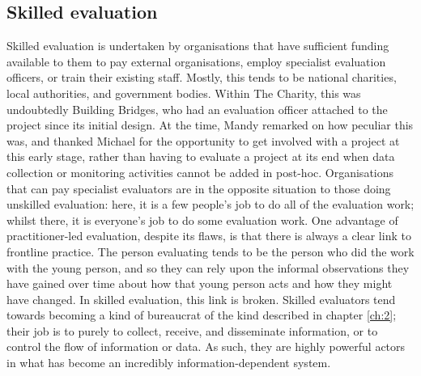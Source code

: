 \subsection{Skilled evaluation}
\label{subsec:6-4-2-skilled-eval}
Skilled evaluation is undertaken by organisations that have sufficient funding available to them to pay external organisations, employ specialist evaluation officers, or train their existing staff. Mostly, this tends to be national charities, local authorities, and government bodies. Within The Charity, this was undoubtedly Building Bridges, who had an evaluation officer attached to the project since its initial design. At the time, Mandy remarked on how peculiar this was, and thanked Michael for the opportunity to get involved with a project at this early stage, rather than having to evaluate a project at its end when data collection or monitoring activities cannot be added in post-hoc. Organisations that can pay specialist evaluators are in the opposite situation to those doing unskilled evaluation: here, it is a few people's job to do all of the evaluation work; whilst there, it is everyone's job to do some evaluation work. One advantage of practitioner-led evaluation, despite its flaws, is that there is always a clear link to frontline practice. The person evaluating tends to be the person who did the work with the young person, and so they can rely upon the informal observations they have gained over time about how that young person acts and how they might have changed. In skilled evaluation, this link is broken. Skilled evaluators tend towards becoming a kind of bureaucrat of the kind described in chapter \ref{ch:2}; their job is to purely to collect, receive, and disseminate information, or to control the flow of information or data. As such, they are highly powerful actors in what has become an incredibly information-dependent system.

